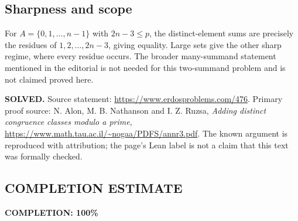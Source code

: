 \subsection*{Sharpness and scope}
For $A=\{0,1,\ldots,n-1\}$ with $2n-3\le p$, the distinct-element sums are precisely the residues of $1,2,\ldots,2n-3$, giving equality. Large sets give the other sharp regime, where every residue occurs. The broader many-summand statement mentioned in the editorial is not needed for this two-summand problem and is not claimed proved here.

\textbf{SOLVED.} Source statement: \url{https://www.erdosproblems.com/476}. Primary proof source: N. Alon, M. B. Nathanson and I. Z. Ruzsa, \emph{Adding distinct congruence classes modulo a prime}, \url{https://www.math.tau.ac.il/~nogaa/PDFS/annr3.pdf}. The known argument is reproduced with attribution; the page's Lean label is not a claim that this text was formally checked.

\subsection*{COMPLETION ESTIMATE}
\textbf{COMPLETION: 100\%}
